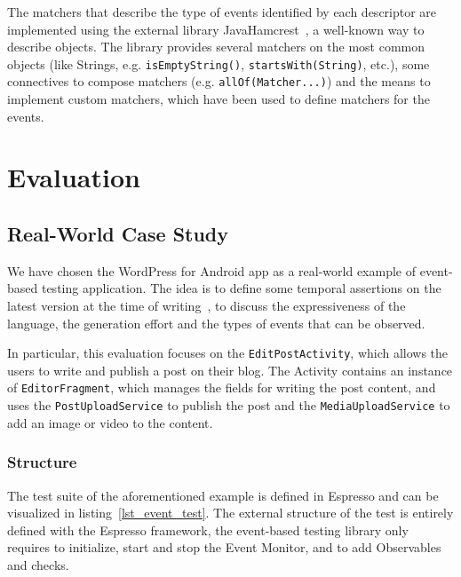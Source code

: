 \documentclass[11pt,a4paper,notitlepage]{article}
\begin{document}
The matchers that describe the type of events identified by each descriptor are implemented using the external library JavaHamcrest~\cite{Hamcrest}, a well-known way to describe objects. The library provides several matchers on the most common objects (like Strings, e.g. \texttt{isEmptyString()}, \texttt{startsWith(String)}, etc.), some connectives to compose matchers (e.g. \texttt{allOf(Matcher...)}) and the means to implement custom matchers, which have been used to define matchers for the events.

\section{Evaluation}

\subsection{Real-World Case Study}\label{event_eval_real}
We have chosen the WordPress for Android app as a real-world example of event-based testing application. The idea is to define some temporal assertions on the latest version at the time of writing~\cite{WordPress2016-07-15}, to discuss the expressiveness of the language, the generation effort and the types of events that can be observed.

In particular, this evaluation focuses on the \texttt{EditPostActivity}, which allows the users to write and publish a post on their blog. The Activity contains an instance of \texttt{EditorFragment}, which manages the fields for writing the post content, and uses the \texttt{PostUploadService} to publish the post and the \texttt{MediaUploadService} to add an image or video to the content.

\subsubsection{Structure}
The test suite of the aforementioned example is defined in Espresso and can be visualized in listing~\ref{lst_event_test}. The external structure of the test is entirely defined with the Espresso framework, the event-based testing library only requires to initialize, start and stop the Event Monitor, and to add Observables and checks.
\end{document}
